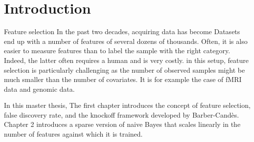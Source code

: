 \cleardoublepage
\chapter*{Introduction}

Feature selection
In the past two decades, acquiring data has become
Datasets end up with a number of features of several dozens of thousands.
Often, it is also easier to measure features than to label the sample with the right category.
Indeed, the latter often requires a human and is very costly.
in this setup, feature selection is particularly challenging as the number of observed samples might be much
smaller than the number of covariates.
It is for example the case of fMRI data and genomic data.

In this master thesis,
The first chapter introduces the concept of feature selection,
false discovery rate,
and the knockoff framework developed by Barber-Candès.
Chapter 2 introduces a sparse version of naive Bayes that scales linearly in the number of features against which
it is trained.
